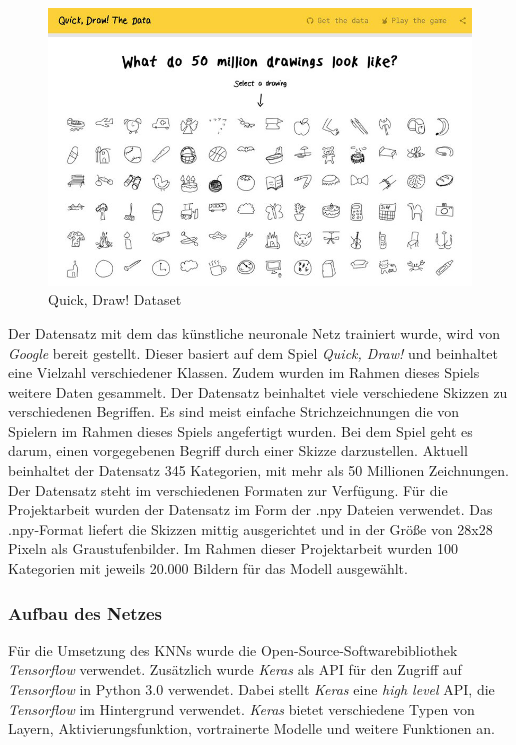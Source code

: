 \documentclass[11pt]{article}
\begin{document}
\begin{figure}[ht]
\centering
\includegraphics[width=1\textwidth]{images/QuickDrawData.jpg}
\caption{\label{fig:classDiagram}Quick, Draw! Dataset}
\end{figure}

Der Datensatz mit dem das künstliche neuronale Netz trainiert wurde, wird von \textit{Google} bereit gestellt. Dieser basiert auf dem Spiel \textit{Quick, Draw!} und beinhaltet eine Vielzahl verschiedener Klassen.  Zudem wurden im Rahmen dieses Spiels weitere Daten gesammelt. Der Datensatz beinhaltet viele verschiedene Skizzen zu verschiedenen Begriffen. Es sind meist einfache Strichzeichnungen die von Spielern im Rahmen dieses Spiels angefertigt wurden. Bei dem Spiel geht es darum, einen vorgegebenen Begriff durch einer Skizze darzustellen. Aktuell beinhaltet der Datensatz 345 Kategorien, mit mehr als 50 Millionen Zeichnungen. Der Datensatz steht im verschiedenen Formaten zur Verfügung.
Für die Projektarbeit wurden der Datensatz im Form der .npy Dateien verwendet. Das .npy-Format liefert die Skizzen mittig ausgerichtet und in der Größe von 28x28 Pixeln als Graustufenbilder.\parencite{GoogleCreativeLab2018}
Im Rahmen dieser Projektarbeit wurden 100 Kategorien mit jeweils 20.000 Bildern für das Modell ausgewählt.

\subsubsection{Aufbau des Netzes}
Für die Umsetzung des KNNs wurde die Open-Source-Softwarebibliothek \textit{Tensorflow} verwendet. Zusätzlich wurde \textit{Keras} als API für den Zugriff auf \textit{Tensorflow} in Python 3.0 verwendet. Dabei stellt \textit{Keras} eine \textit{high level} API, die \textit{Tensorflow} im Hintergrund verwendet. \textit{Keras} bietet verschiedene Typen von Layern, Aktivierungsfunktion, vortrainerte Modelle und weitere Funktionen an.
\end{document}
